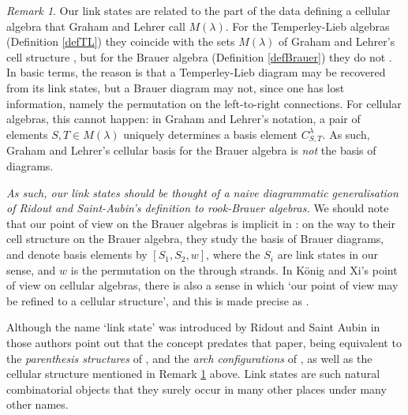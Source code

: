 \documentclass[12pt]{amsart}
\theoremstyle{plain}
\theoremstyle{definition} \newtheorem{definition}[theorem]{Definition}
\theoremstyle{plain}
\theoremstyle{plain} \newtheorem{proposition}[theorem]{Proposition}
\theoremstyle{plain} \newtheorem{conjecture}[theorem]{Conjecture}
\theoremstyle{plain} \newtheorem{corollary}[theorem]{Corollary}
\theoremstyle{remark} \newtheorem{claim}[theorem]{Claim}
\theoremstyle{remark} \newtheorem{remark}[theorem]{Remark}
\theoremstyle{remark} \newtheorem{example}[theorem]{Example}
\theoremstyle{remark} \newtheorem{comment}[theorem]{Comment}
\theoremstyle{definition} \newtheorem{question}[theorem]{Question}
\begin{document}
\begin{remark} \label{rmk:cellVsLS} Our link states are related to the part of the data defining a cellular algebra that Graham and Lehrer \cite{GrahamLehrer} call $M(\lambda)$. For the Temperley-Lieb algebras (Definition \ref{defTL}) they coincide with the sets $M(\lambda)$ of Graham and Lehrer's cell structure \cite[Theorem 6.7]{GrahamLehrer}, but for the Brauer algebra (Definition \ref{defBrauer}) they do not \cite[Theorem 4.10]{GrahamLehrer}. In basic terms, the reason is that a Temperley-Lieb diagram may be recovered from its link states, but a Brauer diagram may not, since one has lost information, namely the permutation on the left-to-right connections. For cellular algebras, this cannot happen: in Graham and Lehrer's notation, a pair of elements $S,T \in M(\lambda)$ uniquely determines a basis element $C_{S,T}^{\lambda}$. As such, Graham and Lehrer's cellular basis for the Brauer algebra is \emph{not} the basis of diagrams.

\emph{As such, our link states should be thought of a naive diagrammatic generalisation of Ridout and Saint-Aubin's definition to rook-Brauer algebras.} We should note that our point of view on the Brauer algebras is implicit in \cite{GrahamLehrer}: on the way to their cell structure on the Brauer algebra, they study the basis of Brauer diagrams, and denote basis elements by $[S_1,S_2,w]$, where the $S_i$ are link states in our sense, and $w$ is the permutation on the through strands. In K\"onig and Xi's point of view on cellular algebras, there is also a sense in which `our point of view may be refined to a cellular structure', and this is made precise as \cite[Corollary 5.1]{KonigXi2}.
\end{remark}

Although the name `link state' was introduced by Ridout and Saint Aubin in \cite{RidoutSaintAubin} those authors point out that the concept predates that paper, being equivalent to the \emph{parenthesis structures} of \cite{Kauffman}, and the \emph{arch configurations} of \cite{FGG-TL}, as well as the cellular structure mentioned in Remark \ref{rmk:cellVsLS} above. Link states are such natural combinatorial objects that they surely occur in many other places under many other names.
\end{document}
